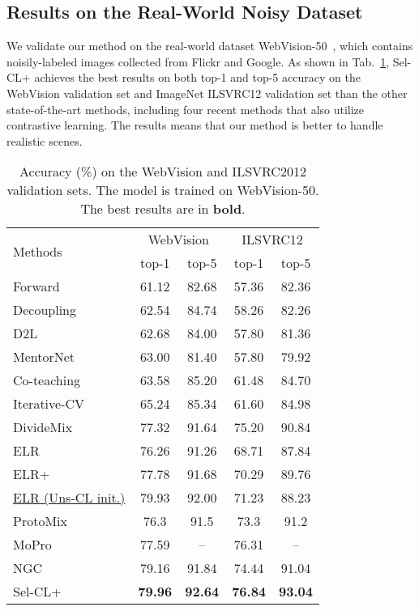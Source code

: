 \documentclass[10pt,twocolumn,letterpaper]{article}
\begin{document}
\subsection{Results on the Real-World Noisy Dataset}\label{sec:4.5}
We validate our method on the real-world
dataset WebVision-50~\cite{abs_1708_02862}, which contains noisily-labeled images collected from Flickr and Google. As shown in Tab.~\ref{webvision}, Sel-CL+ achieves the best results on both top-1 and top-5 accuracy on the WebVision validation set and ImageNet ILSVRC12 validation set than the other state-of-the-art methods, including four recent methods that also utilize contrastive learning. The results means that our method is better to handle realistic scenes. 


\begin{table}[h]		
	\caption{Accuracy (\%) on the WebVision and ILSVRC2012 validation sets. The model is trained on WebVision-50. The best results are in \textbf{bold}.}\vspace{-5pt}\centering
	\small
	\begin{tabular}{l|c|c|c|c}
		\hline \multirow{2}{*}{ Methods } & \multicolumn{2}{|c|}{ WebVision } & \multicolumn{2}{c}{ ILSVRC12 } \\
		\cline { 2 - 5 } & top-1 & top-5 & top-1 & top-5 \\
		\hline Forward~\cite{PatriniRMNQ17} &  61.12  &  82.68  &  57.36  &  82.36  \\
		Decoupling~\cite{malach2017decoupling} &  62.54  &  84.74  &  58.26  &  82.26  \\
		D2L~\cite{MaWHZEXWB18} &  62.68  &  84.00  &  57.80  &  81.36  \\
		MentorNet~\cite{Jiang2018icml} &  63.00  &  81.40  &  57.80  &  79.92  \\
		Co-teaching~\cite{Han2018NIPS} &  63.58  &  85.20  &  61.48  &  84.70  \\
		Iterative-CV~\cite{ChenLCZ19} &  65.24  &  85.34  &  61.60  &  84.98  \\
		DivideMix~\cite{LiSH20} &  77.32  &  91.64  & 75.20 &  90.84  \\
		ELR~\cite{LiuNRF20} &  76.26  &  91.26  &  68.71  &  87.84  \\
		ELR+~\cite{LiuNRF20} &  77.78  &  91.68  &  70.29  &  89.76  \\
		\hline 
		\underline{ELR (Uns-CL init.)} & 79.93 & 92.00 & 71.23 & 88.23\\
		ProtoMix~\cite{li2020learning} & 76.3  & 91.5  & 73.3  & 91.2 \\
		MoPro~\cite{Li2021ICLR}  & 77.59 & -- & 76.31 & -- \\
		NGC~\cite{Zhi2021ICCV}   & 79.16 & 91.84 & 74.44 & 91.04 \\
		Sel-CL+ & \textbf{79.96} & \textbf{92.64} & \textbf{76.84} & \textbf{93.04} 
		\\
		\hline
	\end{tabular}
    \label{webvision}
\end{table}
	
\end{document}
